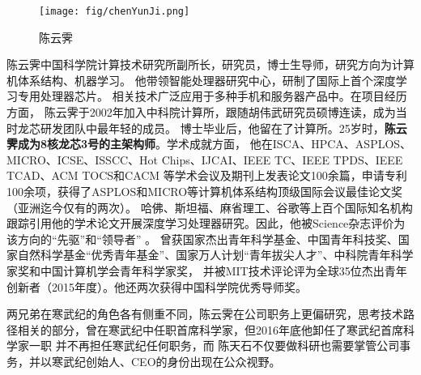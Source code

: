 \begin{figure}%
    \centering
    \texttt{[image: fig/chenYunJi.png]}
    \caption{\footnotesize 陈云霁}
\end{figure}
陈云霁中国科学院计算技术研究所副所长，研究员，博士生导师，研究方向为计算机体系结构、机器学习。
他带领智能处理器研究中心，研制了国际上首个深度学习专用处理器芯片。
相关技术广泛应用于多种手机和服务器产品中。在项目经历方面，
陈云霁于2002年加入中科院计算所，跟随胡伟武研究员硕博连读，成为当时龙芯研发团队中最年轻的成员。
博士毕业后，他留在了计算所。25岁时，\textbf{陈云霁成为8核龙芯3号的主架构师}。学术成就方面，
他在ISCA、HPCA、ASPLOS、MICRO、ICSE、ISSCC、Hot Chips、IJCAI、IEEE TC、IEEE TPDS、IEEE TCAD、ACM TOCS和CACM
等学术会议及期刊上发表论文100余篇，申请专利100余项，获得了ASPLOS和MICRO等计算机体系结构顶级国际会议最佳论文奖（亚洲迄今仅有的两次）。
哈佛、斯坦福、麻省理工、谷歌等上百个国际知名机构跟踪引用他的学术论文开展深度学习处理器研究。因此，他被Science杂志评价为该方向的“先驱”和“领导者”  。
曾获国家杰出青年科学基金、中国青年科技奖、国家自然科学基金“优秀青年基金”、国家万人计划“青年拔尖人才”、中科院青年科学家奖和中国计算机学会青年科学家奖，
并被MIT技术评论评为全球35位杰出青年创新者（2015年度）。他还两次获得中国科学院优秀导师奖。\par
两兄弟在寒武纪的角色各有侧重不同，陈云霁在公司职务上更偏研究，思考技术路径相关的部分，曾在寒武纪中任职首席科学家，但2016年底他卸任了寒武纪首席科学家一职
并不再担任寒武纪任何职务，而
陈天石不仅要做科研也需要掌管公司事务，并以寒武纪创始人、CEO的身份出现在公众视野。

